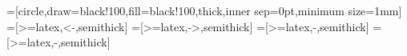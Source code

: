 
\newcommand{\PIVAL}{3.14159265358979323846264338} %
\newcommand{\Circulant}[2] { 						%
	\begin{tikzpicture}
	\setcounter{i}{0}
	\whiledo{\value{i}<#1}{  						%
		\FPmul\tempA{2}{\thei} 						%
		\FPdiv\tempB{\PIVAL}{#1}						%
		\FPmul\tempC{\tempA}{\tempB}					%
		\FPcos\varX{\tempC} 							%
		\FPsin\varY{\tempC} 							%
		\stepcounter{i} 								%
		\node[label=\arabic{i}] (\thei) at (\varX,\varY)[place]{}; 	%
		\foreach \x in {#2} { 						%
			\pgfmathparse{mod(\x+\thei,#1)} 			%
			\let\tempD\pgfmathresult
			\pgfmathparse{mod(\thei-\x,#1)} 			%
			\let\tempE\pgfmathresult
			\ifthenelse{\lengthtest{\tempE pt < 1 pt}}{\FPadd\tempE{\tempE}{#1}}{}
			\ifthenelse{\lengthtest{\tempD pt < 1 pt}}{\FPadd\tempD{\tempD}{#1}}{}
			\ifthenelse{\lengthtest{\tempE pt > \thei pt}}{}{\draw [] (\thei) to (\tempE)};
			\ifthenelse{\lengthtest{\tempD pt > \thei pt}}{}{\draw [] (\thei) to (\tempD)};
		}
	}
	\end{tikzpicture}
}

=[circle,draw=black!100,fill=black!100,thick,inner sep=0pt,minimum size=1mm]
=[>=latex,<-,semithick]
=[>=latex,->,semithick]
=[>=latex,-,semithick]
=[>=latex,-,semithick]
